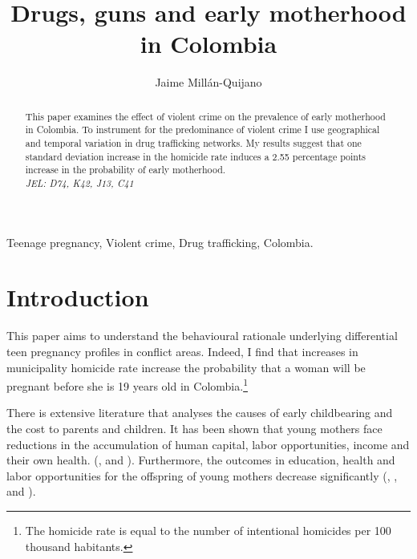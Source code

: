 \documentclass[a4paper,10pt,twocolumn,preprint,3p,authoryear]{elsarticle}
\begin{document}
\begin{frontmatter}
	\title{Drugs, guns and early motherhood in Colombia}

	\author{Jaime Mill\'an-Quijano}
	\address{Universidad Carlos III de Madrid. \\
		 Calle Madrid 126, Getafe. \\
		 28093, Spain.} 

	\begin{abstract}
		 This paper examines the effect of violent crime on the prevalence of early motherhood in Colombia. To instrument for the predominance of violent crime I use geographical and temporal variation in drug trafficking networks. My results suggest that one standard deviation increase in the homicide rate induces a 2.55 percentage points increase in the probability of early motherhood. \\
		  \emph{JEL: D74, K42, J13, C41}
	\end{abstract}

	\begin{keyword}
		 Teenage pregnancy, Violent crime, Drug trafficking, Colombia.
	\end{keyword}
\end{frontmatter}


\section{Introduction\label{sec:Intro}}
This paper aims to understand the behavioural rationale underlying differential teen pregnancy profiles in conflict areas. Indeed, I find that increases in municipality homicide rate increase the probability that a woman will be pregnant before she is 19 years old in Colombia.\footnote{The homicide rate is equal to the number of intentional homicides per 100 thousand habitants.}

There is extensive literature that analyses the causes of early childbearing and the cost to parents and children. It has been shown that young mothers face reductions in the accumulation of human capital, labor opportunities, income and their own health.  (\citet{KlepingerLundbergPlotnick1999},  \citet{Buckles2008} and \citet{Fletcher2011}).  Furthermore, the outcomes in education, health and labor opportunities for the offspring of young mothers decrease significantly (\citet{KlepingerLundbergPlotnick1999}, \citet{Buckles2008}, \citet{Francesconi2008} and \citet{Miller2009,Miller2011}).
\end{document}
